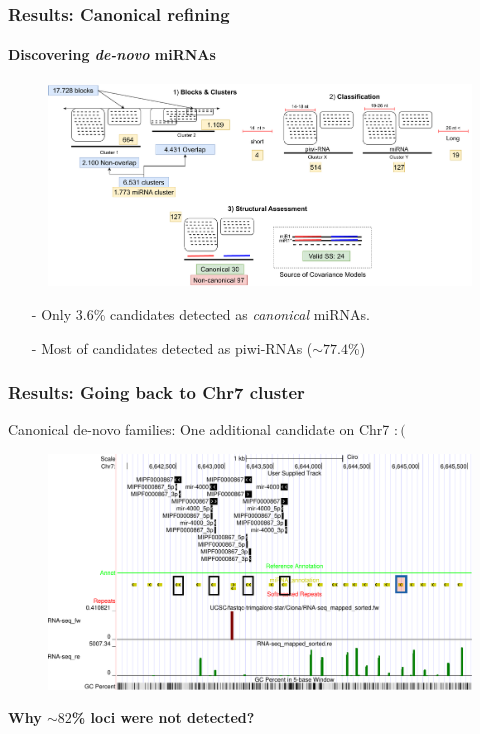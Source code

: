 \begin{frame}[t]
    \frametitle{Results: Canonical refining}
    \framesubtitle{Discovering \textit{de-novo} miRNAs}
    \begin{figure}[h!]
        \centering
        \includegraphics[width=\linewidth]{Figures/results_workflowALL}\label{fig:workflow} %
    \end{figure}
    \begin{itemize}
        \item[-] Only $3.6$\% candidates detected as \textit{canonical} miRNAs.
        \item[-] Most of candidates detected as piwi-RNAs ($\sim 77.4$\%)
    \end{itemize}
\end{frame}

\begin{frame}[t]
    \frametitle{Results: Going back to Chr7 cluster}
    Canonical de-novo families: One additional candidate on Chr7 $:($
    \begin{figure}[h!]
        \centering
        \includegraphics[width=0.9\linewidth]{Figures/homology_coverage_denonvo} %
    \end{figure}
    \textbf{Why $\sim82$\% loci were not detected?} 
\end{frame}

